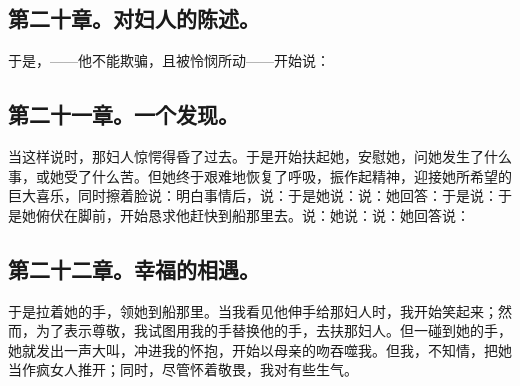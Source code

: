 
\subsection{第二十章。对妇人的陈述。}

于是，——他不能欺骗，且被怜悯所动——开始说：\par


\subsection{第二十一章。一个发现。}

当这样说时，那妇人惊愕得昏了过去。于是开始扶起她，安慰她，问她发生了什么事，或她受了什么苦。但她终于艰难地恢复了呼吸，振作起精神，迎接她所希望的巨大喜乐，同时擦着脸说：明白事情后，说：于是她说：说：她回答：于是说：于是她俯伏在脚前，开始恳求他赶快到船那里去。说：她说：说：她回答说：\par


\subsection{第二十二章。幸福的相遇。}

于是拉着她的手，领她到船那里。当我看见他伸手给那妇人时，我开始笑起来；然而，为了表示尊敬，我试图用我的手替换他的手，去扶那妇人。但一碰到她的手，她就发出一声大叫，冲进我的怀抱，开始以母亲的吻吞噬我。但我，不知情，把她当作疯女人推开；同时，尽管怀着敬畏，我对有些生气。\par

